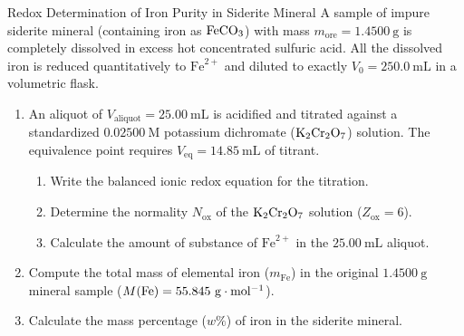 \begin{exercise}{Redox Determination of Iron Purity in Siderite Mineral}
A sample of impure siderite mineral (containing iron as $\ce{FeCO3}$) with mass $m_{\text{ore}} = 1.4500\ \mathrm{g}$ is completely dissolved in excess hot concentrated sulfuric acid. All the dissolved iron is reduced quantitatively to $\mathrm{Fe}^{2+}$ and diluted to exactly $V_0 = 250.0\ \mathrm{mL}$ in a volumetric flask.
\begin{enumerate}[leftmargin=1.5em,itemsep=2pt]
  \item An aliquot of $V_{\text{aliquot}} = 25.00\ \mathrm{mL}$ is acidified and titrated against a standardized $0.02500\ \mathrm{M}$ potassium dichromate ($\ce{K2Cr2O7}$) solution. The equivalence point requires $V_{\text{eq}} = 14.85\ \mathrm{mL}$ of titrant.
  \begin{enumerate}[leftmargin=1.2em,itemsep=1pt]
    \item Write the balanced ionic redox equation for the titration.
    \item Determine the normality $N_{\text{ox}}$ of the $\ce{K2Cr2O7}$ solution ($Z_{\text{ox}} = 6$).
    \item Calculate the amount of substance of $\mathrm{Fe}^{2+}$ in the $25.00\ \mathrm{mL}$ aliquot.
  \end{enumerate}
  \item Compute the total mass of elemental iron ($m_{\text{Fe}}$) in the original $1.4500\ \mathrm{g}$ mineral sample ($M(\ce{Fe}) = 55.845\ \mathrm{g\cdot mol^{-1}}$).
  \item Calculate the mass percentage ($w\%$) of iron in the siderite mineral.
\end{enumerate}
\end{exercise}

\begin{tabletworkspace}[5.0cm]
\end{tabletworkspace}

